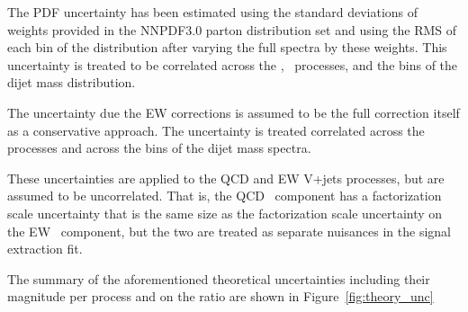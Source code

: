 The PDF uncertainty has been estimated using the standard deviations of
weights provided in the NNPDF3.0 parton distribution set and 
using the RMS of each bin of the distribution after varying the full
spectra by these weights. This uncertainty is treated to be correlated across the 
\Zjets, \Wjets~processes, and the bins of the dijet mass distribution.

The uncertainty due the EW corrections is assumed to be the full correction itself as 
a conservative approach. The uncertainty is treated correlated across the processes and 
across the bins of the dijet mass spectra.

These uncertainties are applied to the QCD and EW V+jets processes, but are assumed to be uncorrelated. That is, the QCD \Wjets~component has a factorization scale uncertainty that is the same size as the factorization scale uncertainty on the EW \Wjets~component, but the two are treated as separate nuisances in the signal extraction fit.

The summary of the aforementioned theoretical uncertainties including their magnitude per process 
and on the ratio are shown in Figure~\ref{fig:theory_unc}

